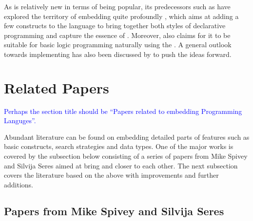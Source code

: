 \documentclass[thesis-solanki.tex]{subfiles}
\begin{document}
As  is relatively new in terms of being popular, its predecessors such as  have
explored the territory of embedding  quite profoundly \cite{friedman05reasoned}, which aims at adding a few
constructs to the language to bring together both styles of declarative programming and capture the essence of
.
Moreover,  also claims for it to be suitable for basic logic programming naturally using the
 \cite{website:logicprogexamplehaskell}.
A general outlook towards implementing  has also been discussed by
\cite{krishnamurthi2007programming} to push the ideas forward.

\section{Related Papers}
\textcolor{blue}{Perhaps the section title should be ``Papers related to embedding Programming Languges''.}

Abundant literature can be found on embedding detailed parts of  features such as basic
constructs, search strategies and data types.
One of the major works is covered by the subsection below consisting of a series of papers from Mike Spivey and
Silvija Seres aimed at bring  and  closer to each other.
The next subsection covers the literature based on the above
with improvements and further additions.


\subsection{Papers from Mike Spivey and Silvija Seres}
\end{document}
